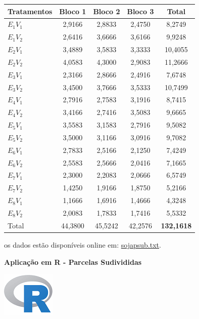 \documentclass[
]{book}
\newenvironment{Shaded}{\begin{snugshade}}{\end{snugshade}}
\newcommand{\DataTypeTok}[1]{\textcolor[rgb]{0.13,0.29,0.53}{#1}}
\newcommand{\KeywordTok}[1]{\textcolor[rgb]{0.13,0.29,0.53}{\textbf{#1}}}
\newcommand{\NormalTok}[1]{#1}
\newcommand{\OperatorTok}[1]{\textcolor[rgb]{0.81,0.36,0.00}{\textbf{#1}}}
\newcommand{\StringTok}[1]{\textcolor[rgb]{0.31,0.60,0.02}{#1}}
\begin{document}
\begin{longtable}[]{@{}lcccc@{}}
\toprule
Tratamentos & Bloco 1 & Bloco 2 & Bloco 3 & Total\tabularnewline
\midrule
\endhead
\(E_1V_1\) & 2,9166 & 2,8833 & 2,4750 & 8,2749\tabularnewline
\(E_1V_2\) & 2,6416 & 3,6666 & 3,6166 & 9,9248\tabularnewline
\(E_2V_1\) & 3,4889 & 3,5833 & 3,3333 & 10,4055\tabularnewline
\(E_2V_2\) & 4,0583 & 4,3000 & 2,9083 & 11,2666\tabularnewline
\(E_3V_1\) & 2,3166 & 2,8666 & 2,4916 & 7,6748\tabularnewline
\(E_3V_2\) & 3,4500 & 3,7666 & 3,5333 & 10,7499\tabularnewline
\(E_4V_1\) & 2,7916 & 2,7583 & 3,1916 & 8,7415\tabularnewline
\(E_4V_2\) & 3,4166 & 2,7416 & 3,5083 & 9,6665\tabularnewline
\(E_5V_1\) & 3,5583 & 3,1583 & 2,7916 & 9,5082\tabularnewline
\(E_5V_2\) & 3,5000 & 3,1166 & 3,0916 & 9,7082\tabularnewline
\(E_6V_1\) & 2,7833 & 2,5166 & 2,1250 & 7,4249\tabularnewline
\(E_6V_2\) & 2,5583 & 2,5666 & 2,0416 & 7,1665\tabularnewline
\(E_7V_1\) & 2,3000 & 2,2083 & 2,0666 & 6,5749\tabularnewline
\(E_7V_2\) & 1,4250 & 1,9166 & 1,8750 & 5,2166\tabularnewline
\(E_8V_1\) & 1,1666 & 1,6916 & 1,4666 & 4,3248\tabularnewline
\(E_8V_2\) & 2,0083 & 1,7833 & 1,7416 & 5,5332\tabularnewline
Total & 44,3800 & 45,5242 & 42,2576 & \textbf{132,1618}\tabularnewline
\bottomrule
\end{longtable}

os dados estão disponíveis online em: \href{https://raw.githubusercontent.com/arpanosso/curso_GIEU/master/dados/sojapsub.txt}{sojapsub.txt}.

\textbf{Aplicação em R - Parcelas Sudivididas}

\includegraphics{R.png}

\begin{Shaded}
\end{Shaded}
\end{document}
